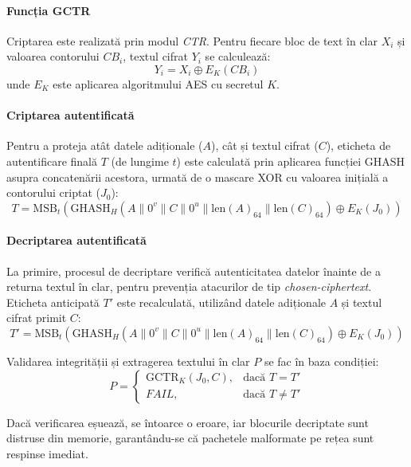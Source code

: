 \paragraph{Funcția GCTR}
Criptarea este realizată prin modul \textit{CTR}. Pentru fiecare bloc de text în clar $X_i$ și valoarea contorului $CB_i$, textul cifrat $Y_i$ se calculează:
$$ Y_i = X_i \oplus E_K(CB_i) $$
unde $E_K$ este aplicarea algoritmului AES cu secretul $K$.

\paragraph{Criptarea autentificată}
Pentru a proteja atât datele adiționale ($A$), cât și textul cifrat ($C$), eticheta de autentificare finală $T$ (de lungime $t$) este calculată prin aplicarea funcției GHASH asupra concatenării acestora, urmată de o mascare XOR cu valoarea inițială a contorului criptat ($J_0$):
$$ T = \text{MSB}_t \left( \text{GHASH}_H(A \parallel 0^v \parallel C \parallel 0^u \parallel \text{len}(A)_{64} \parallel \text{len}(C)_{64}) \oplus E_K(J_0) \right) $$

\paragraph{Decriptarea autentificată}
La primire, procesul de decriptare verifică autenticitatea datelor înainte de a returna textul în clar, pentru prevenția atacurilor de tip \textit{chosen-ciphertext}. Eticheta anticipată $T'$ este recalculată, utilizând datele adiționale $A$ și textul cifrat primit $C$:
$$ T' = \text{MSB}_t \left( \text{GHASH}_H(A \parallel 0^v \parallel C \parallel 0^u \parallel \text{len}(A)_{64} \parallel \text{len}(C)_{64}) \oplus E_K(J_0) \right) $$

Validarea integrității și extragerea textului în clar $P$ se fac în baza condiției:
$$ P = 
\begin{cases} 
\text{GCTR}_K(J_0, C), & \text{dacă } T = T' \\ 
\mathit{FAIL}, & \text{dacă } T \neq T' 
\end{cases} 
$$

Dacă verificarea eșuează, se întoarce o eroare, iar blocurile decriptate sunt distruse din memorie, garantându-se că pachetele malformate pe rețea sunt respinse imediat.